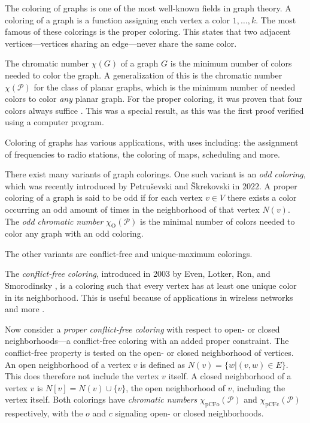 \documentclass{article}
\begin{document}
The coloring of graphs is one of the most well-known fields in graph theory. A coloring of a graph is a function assigning each vertex a color $1, \dots, k$. The most famous of these colorings is the proper coloring. This states that two adjacent vertices---vertices sharing an edge---never share the same color. 

The chromatic number $\chi(G)$ of a graph $G$ is the minimum number of colors needed to color the graph. A generalization of this is the chromatic number $\chi(\mathcal{P})$ for the class of planar graphs, which is the minimum number of needed colors to color \textit{any} planar graph. For the proper coloring, it was proven that four colors always suffice \cite{appel1976every}. This was a special result, as this was the first proof verified using a computer program.

Coloring of graphs has various applications, with uses including: the assignment of frequencies to radio stations, the coloring of maps, scheduling and more.

There exist many variants of graph colorings. One such variant is an \textit{odd coloring}, which was recently introduced by Petruševski and Škrekovski \cite{PETRUSEVSKI2022385} in $2022$. A proper coloring of a graph is said to be odd if for each vertex $v \in V$ there exists a color occurring an odd amount of times in the neighborhood of that vertex $N(v)$. The \textit{odd chromatic number} $\chi_{\mathrm{O}}(\mathcal{P})$ is the minimal number of colors needed to color any graph with an odd coloring.

The other variants are conflict-free and unique-maximum colorings. 

The \textit{conflict-free coloring}, introduced in 2003 by Even, Lotker, Ron, and Smorodinsky \cite{even2003conflict}, is a coloring such that every vertex has at least one unique color in its neighborhood. This is useful because of applications in wireless networks and more \cite{smorodinsky2013conflict}.

Now consider a \textit{proper conflict-free coloring} with respect to open- or closed neighborhoods---a conflict-free coloring with an added proper constraint. The conflict-free property is tested on the open- or closed neighborhood of vertices. 
An open neighborhood of a vertex $v$ is defined as $N(v) = \{w | (v, w) \in E\}$. This does therefore not include the vertex $v$ itself. A closed neighborhood of a vertex $v$ is $N[v] = N(v) \cup \{v\}$, the open neighborhood of $v$, including the vertex itself. 
Both colorings have \textit{chromatic numbers} $\chi_{\mathrm{pCFo}}(\mathcal{P})$ and $\chi_{\mathrm{pCFc}}(\mathcal{P})$ respectively, with the $o$ and $c$ signaling open- or closed neighborhoods.
\end{document}
